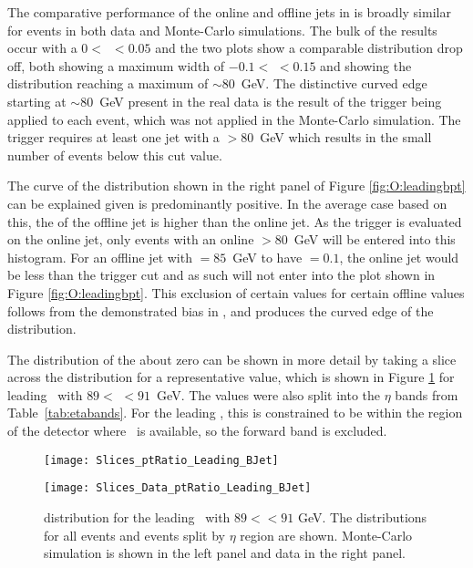 		\newpage
		The comparative performance of the online and offline jets in \pt is broadly similar for events in both data and Monte-Carlo simulations. The bulk of the results occur with a $0<$~\dptpt$<0.05$ and the two plots show a comparable distribution drop off, both showing a maximum \dptpt width of $-0.1 <$ \dptpt$<0.15$ and showing the \pt distribution reaching a maximum of $\sim80$~GeV. The distinctive curved edge starting at \pt$\sim80$~GeV present in the real data is the result of the trigger being applied to each event, which was not applied in the Monte-Carlo simulation. The trigger requires at least one jet with a \pt$>80$~GeV which results in the small number of events below this cut value.

		The curve of the distribution shown in the right panel of Figure \ref{fig:O:leadingbpt} can be explained given \dptpt is predominantly positive. In the average case based on this, the \pt of the offline jet is higher than the online jet. As the trigger is evaluated on the online jet, only events with an online \pt$>80$~GeV will be entered into this histogram. For an offline jet with \pt$=85$~GeV to have \dptpt$=0.1$, the online jet would be less than the trigger \pt cut and as such will not enter into the plot shown in Figure \ref{fig:O:leadingbpt}. This exclusion of certain \dptpt values for certain offline \pt values follows from the demonstrated bias in \dptpt, and produces the curved edge of the distribution.

		The distribution of the \dptpt about zero can be shown in more detail by taking a slice across the distribution for a representative \pt value, which is shown in Figure \ref{fig:O:leadingbptslice} for leading \bjets\ with $89<$ \pt$<91$~GeV. The \dptpt values were also split into the $\eta$ bands from Table~\ref{tab:etabands}. For the leading \bjet, this is constrained to be within the region of the detector where \btag\, is available, so the forward band is excluded.

		\begin{figure}[h]
			\centering

			\begin{minipage}[h]{0.48\linewidth}
				\texttt{[image: Slices\_ptRatio\_Leading\_BJet]}
			\end{minipage}
			\quad
			\begin{minipage}[h]{0.48\linewidth}
				\texttt{[image: Slices\_Data\_ptRatio\_Leading\_BJet]}
			\end{minipage}
			\caption[\dptpt distribution for leading \bjets\ with $89<$\pt$<91$ in data and Monte-Carlo simulations]{\dptpt distribution for the leading \bjet\ with $89<$\pt$<91$ GeV. The distributions for all events and events split by $\eta$ region are shown. Monte-Carlo simulation is shown in the left panel and data in the right panel.}
			\label{fig:O:leadingbptslice}
		\end{figure}


